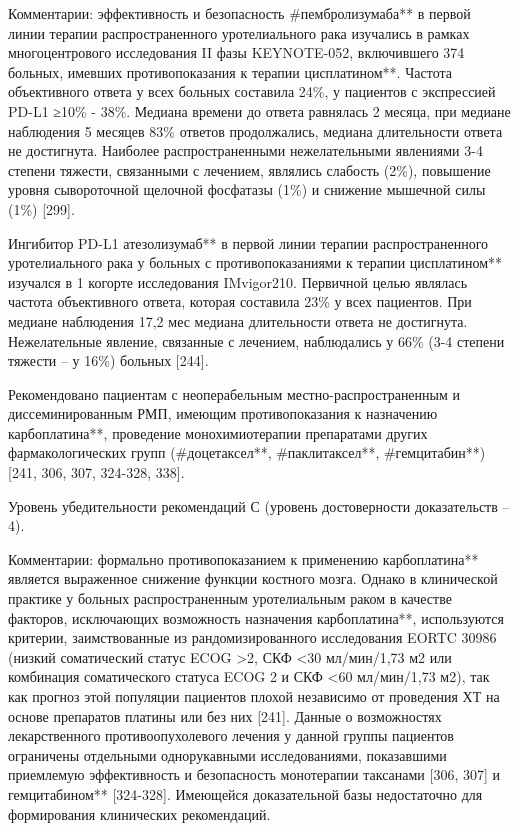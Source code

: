 Комментарии: эффективность и безопасность #пембролизумаба** в первой линии терапии распространенного уротелиального рака изучались в рамках многоцентрового исследования II фазы KEYNOTE-052, включившего 374 больных, имевших противопоказания к терапии цисплатином**. Частота объективного ответа у всех больных составила 24\%, у пациентов с экспрессией PD-L1 ≥10\% - 38\%. Медиана времени до ответа равнялась 2 месяца, при медиане наблюдения 5 месяцев 83\% ответов продолжались, медиана длительности ответа не достигнута. Наиболее распространенными нежелательными явлениями 3-4 степени тяжести, связанными с лечением, являлись слабость (2\%), повышение уровня сывороточной щелочной фосфатазы (1\%) и снижение мышечной силы (1\%) [299].

Ингибитор PD-L1 атезолизумаб** в первой линии терапии распространенного уротелиального рака у больных с противопоказаниями к терапии цисплатином** изучался в 1 когорте исследования IMvigor210. Первичной целью являлась частота объективного ответа, которая составила 23\% у всех пациентов. При медиане наблюдения 17,2 мес медиана длительности ответа не достигнута. Нежелательные явление, связанные с лечением, наблюдались у 66\% (3-4 степени тяжести – у 16\%) больных [244].

Рекомендовано пациентам с неоперабельным местно-распространенным и диссеминированным РМП, имеющим противопоказания к назначению карбоплатина**, проведение монохимиотерапии препаратами других фармакологических групп (#доцетаксел**, #паклитаксел**, #гемцитабин**) [241, 306, 307, 324-328, 338].

Уровень убедительности рекомендаций С (уровень достоверности доказательств – 4).

Комментарии: формально противопоказанием к применению карбоплатина** является выраженное снижение функции костного мозга. Однако в клинической практике у больных распространенным уротелиальным раком в качестве факторов, исключающих возможность назначения карбоплатина**, используются критерии, заимствованные из рандомизированного исследования EORTC 30986 (низкий соматический статус ECOG >2, СКФ <30 мл/мин/1,73 м2 или комбинация соматического статуса ECOG 2 и СКФ <60 мл/мин/1,73 м2), так как прогноз этой популяции пациентов плохой независимо от проведения ХТ на основе препаратов платины или без них [241]. Данные о возможностях лекарственного противоопухолевого лечения у данной группы пациентов ограничены отдельными однорукавными исследованиями, показавшими приемлемую эффективность и безопасность монотерапии таксанами [306, 307] и гемцитабином** [324-328]. Имеющейся доказательной базы недостаточно для формирования клинических рекомендаций.

